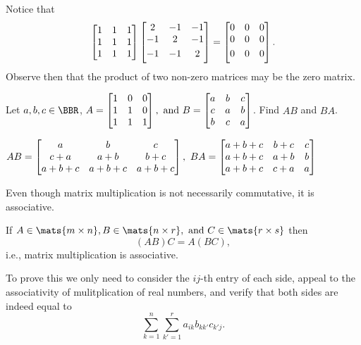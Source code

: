 \begin{exa}
Notice that $$\begin{bmatrix} {1} & {1} & {1} \cr
 {1}  & {1} & 1 \cr
{1}  & {1} & {1} \cr
\end{bmatrix}
\begin{bmatrix}
{2}  & -{1} & -{1} \\ \vspace{1mm} -{1} & {2} & -{1}
\\ \vspace{1mm}
-{1}  & -{1} & {2} \\
\end{bmatrix}  = \begin{bmatrix}
0  & 0 & 0 \cr \vspace{1mm} 0  & 0 & 0 \cr \vspace{1mm} 0  & 0 & 0
\cr
\end{bmatrix}.$$
Observe then that  the product of two non-zero matrices may be
the zero matrix.
\end{exa}

\newpage

\begin{exer}
Let $a,b,c\in \BBR$,
 $A = \begin{bmatrix}1 & 0 & 0 \cr 1 & 1 & 0 \cr 1 & 1 & 1 \cr
\end{bmatrix},  \mbox{ and } B = \begin{bmatrix}
a & b & c \cr c & a & b \cr b & c & a \cr \end{bmatrix}$. 
Find
$AB$ and $BA$.
\vspace*{3.25in}
\begin{answer}  
$AB = \begin{bmatrix} a & b & c \cr c+a & a + b & b + c
\cr a + b + c & a + b + c & a + b + c \cr
 \end{bmatrix}, \ BA = \begin{bmatrix} a + b + c & b + c & c
 \cr a + b + c & a + b & b \cr a + b + c & c + a & a \cr
\end{bmatrix}
 $ 
 \end{answer}
\end{exer}


Even though matrix multiplication is not necessarily commutative,
it is associative.
\begin{thm}
If $A \in 
\mats{m\times n },
B \in \mats{n\times r}, \mbox{ and }
C \in \mats{r \times s}$ then $$(AB)C = A(BC),$$
i.e., matrix multiplication is associative.
\begin{pf} 
To prove this we only need to consider the $ij$-th entry of each side,
appeal to the associativity of mulitplication of real numbers, and
verify that both sides are indeed equal to
$$\sum _{k = 1} ^{n}\sum _{k' = 1} ^{r} a_{ik}b_{kk'}c_{k'j}.$$
\end{pf}
\end{thm}

